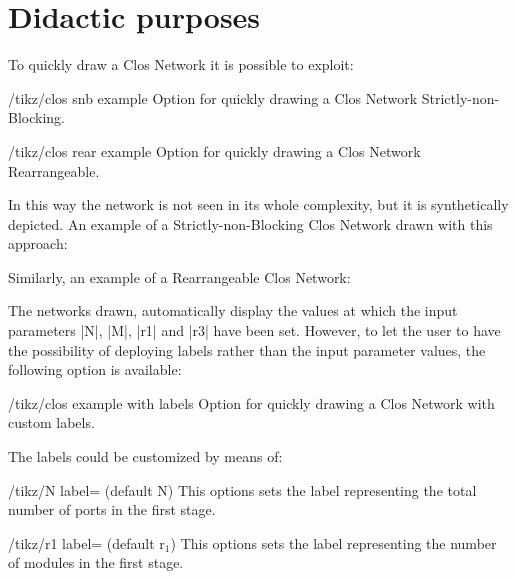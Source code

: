 \documentclass{ltxdoc} %
\begin{document}
\section{Didactic purposes}
To quickly draw a Clos Network  it is possible to exploit:
\begin{key}{/tikz/clos snb example}
    Option for quickly drawing a Clos Network Strictly-non-Blocking.
\end{key}
\begin{key}{/tikz/clos rear example}
    Option for quickly drawing a Clos Network Rearrangeable.
\end{key}
In this way the network is not seen in its whole complexity, but it is synthetically  depicted. An example of a Strictly-non-Blocking Clos Network drawn with this approach:
\begin{codeexample}[]
\end{codeexample}

Similarly, an example of a Rearrangeable Clos Network:
\begin{codeexample}[]
\end{codeexample}

The networks drawn, automatically display the values at which the input parameters |N|, |M|, |r1| and |r3| have been set. However, to let the user to have the possibility of deploying labels rather than the input parameter values, the following option is available:

\begin{key}{/tikz/clos example with labels}
    Option for quickly drawing a Clos Network with custom labels.
\end{key}

The labels could be customized by means of:
\begin{key}{/tikz/N label= (default N)}
    This options sets the label representing the total number of ports in the first stage.
\end{key}

\begin{key}{/tikz/r1 label= (default r$_1$)}
    This options sets the label representing the number of modules in the first stage.
\end{key}
\end{document}
